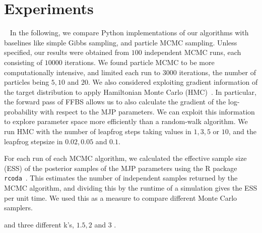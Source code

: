 
\section{Experiments}~
In the following, we compare Python implementations of our algorithms with baselines like simple Gibbs sampling, 
and particle MCMC sampling. Unless specified, our results were
obtained from $100$ independent MCMC runs, each consisting of $10000$ iterations.
We found particle MCMC to be more computationally intensive, and limited each 
run to $3000$ iterations, the number of particles being $5, 10$ and $20$. 
We also considered exploiting gradient information of the target distribution to 
apply Hamiltonian Monte Carlo (HMC)~\cite{Neal2010}. In particular, the forward 
pass of FFBS allows us to also calculate the gradient of the log-probability with
respect to the MJP parameters. We can exploit this information to explore parameter
space more efficiently than a random-walk algorithm. We run HMC with the number of leapfrog steps taking values in $1, 3, 5$ or $10$, and the leapfrog stepsize in 
$0.02, 0.05$ and $0.1$. 

For each run of each MCMC algorithm, we calculated the effective sample size (ESS) of the posterior samples of the MJP parameters using the R 
package \texttt{rcoda}~\cite{Rcoda2006}. This estimates the number of independent samples returned by the MCMC algorithm,
and dividing this by the runtime of a 
simulation gives the ESS per unit time. We used this as a measure to compare different Monte Carlo samplers.

 and three different k's, $1.5, 2$ and $3$ . 

